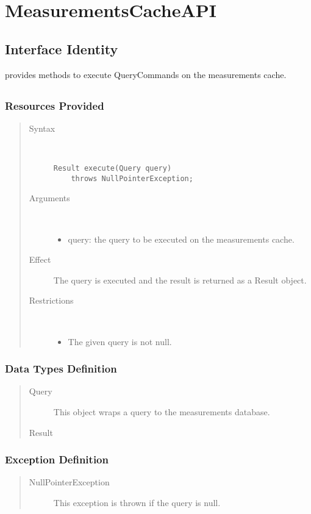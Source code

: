 \section{MeasurementsCacheAPI}
\label{api:measurements-storage-cache-api}

\subsection{Interface Identity}

\npar {} provides methods to execute
QueryCommands on the measurements cache.

\subsection{}

\subsubsection{Resources Provided}

\begin{quote}
	\begin{description}
		\item[Syntax] \ 
		\begin{verbatim}
Result execute(Query query) 
    throws NullPointerException;
		\end{verbatim}
		\item[Arguments] \
		\begin{itemize}
			\item query: the query to be executed on the measurements cache. 
		\end{itemize}
		\item[Effect] The query is executed and the result is returned as a Result
		object.
		\item[Restrictions] \ 
		\begin{itemize}
			\item The given query is not null.
		\end{itemize}
	\end{description} 
\end{quote}

\subsubsection{Data Types Definition}

\begin{quote}
	\begin{description}
		\item[Query] This object wraps a query to the measurements database.
		\item[Result] %
	\end{description} 
\end{quote}

\subsubsection{Exception Definition}

\begin{quote}
	\begin{description}
		\item[NullPointerException] This exception is thrown if the query is null.
	\end{description} 
\end{quote}